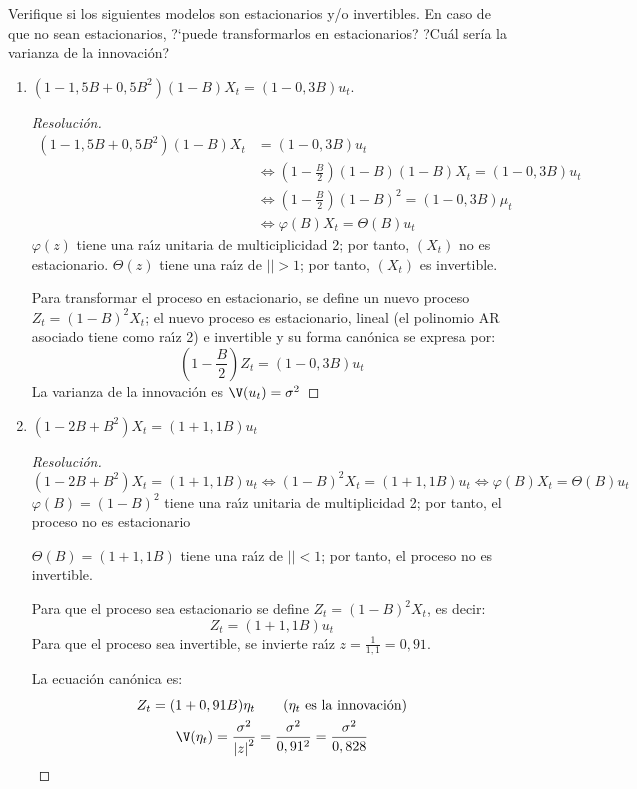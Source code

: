 \begin{ejemplo}
Verifique si los siguientes modelos son estacionarios y/o invertibles. En 
caso de que no sean estacionarios, ?`puede transformarlos en estacionarios? 
?Cu\'{a}l ser\'{i}a la varianza de la innovaci\'{o}n?

\begin{enumerate}
\item $(1-1,5 B +0,5 B^{2} ) (1 - B) X_{t}= (1-0,3B) u_{t}$.
\begin{proof}[Resoluci\'{o}n]
\begin{align*}
(1-1,5 B +0,5 B^{2}) (1 - B) X_{t}&=(1-0,3B) u_{{t }}\\
&\Longleftrightarrow
	\left(1-\frac{B}{2}\right)(1-B)(1-B)X_{t} = (1-0,3B)u_{t} \\
&\Longleftrightarrow
	\left(1-\frac{B}{2}\right)(1-B)^{2}=(1-0,3B)\mu_{t}\\
&\Longleftrightarrow
	\varphi (B)X_{t} = \Theta (B)u_{t} 
\end{align*}
$\varphi (z)$ tiene una ra\'{\i}z unitaria de multiciplicidad 2; por tanto, 
$(X_{t} )$ no es estacionario. $\Theta (z)$ tiene una ra\'{\i}z de $\left| 
\right|>1$; por tanto, $(X_{t} )$ es invertible.

Para transformar el proceso en estacionario, se define un nuevo proceso 
$Z_{t} =(1-B)^{2}X_{t} $; el nuevo proceso es estacionario, lineal (el 
polinomio AR asociado tiene como ra\'{\i}z 2) e invertible y su forma 
can\'{o}nica se expresa por:
\[
\left(1-\frac{B}{2}\right)Z_{t} =(1-0,3B)u_{t} 
\]
La varianza de la innovaci\'{o}n es $\V(u_{t} )=\sigma^{2}$
\end{proof}

\item $(1-2 B + B^{2})X_{t}=(1+1,1B) u_{t}$
\begin{proof}[Resoluci\'{o}n]
\[
 (1-2B +B^{2})X_{t}=(1+1,1B) u_{t}\Leftrightarrow (1-B)^{2}X_{t} =(1+1,1B)u_{t} \Leftrightarrow \varphi (B)X_{t} =\Theta (B)u_{t}
\]
$\varphi (B)=
(1-B)^{2}$ tiene una ra\'{\i}z unitaria de multiplicidad 2; por tanto, el 
proceso no es estacionario

$\Theta (B)=
(1+1,1B)$ tiene una ra\'{\i}z de $\left| \right|<1$; por tanto, el 
proceso no es invertible.

Para que el proceso sea estacionario se define $Z_{t} =(1-B)^{2}X_{t} $, es 
decir:
\[
Z_{t} =(1+1,1B)u_{t} 
\]
Para que el proceso sea invertible, se invierte ra\'{\i}z 
$z=\frac{1}{1,1}=0,91$.

La ecuaci\'{o}n can\'{o}nica es:
\begin{gather*}
 Z_{t} =(1+0,91B)\eta_{t}\qquad (\eta_{t}\text{ es la innovaci\'{o}n})\\
 \V(\eta_{t} )=\frac{\sigma^{2}}{\left| z \right|^{2}}=\frac{\sigma ^{2}}{0,91^{2}}=\frac{\sigma^{2}}{0,828}
\end{gather*}
\end{proof}


\end{enumerate}
\end{ejemplo}
